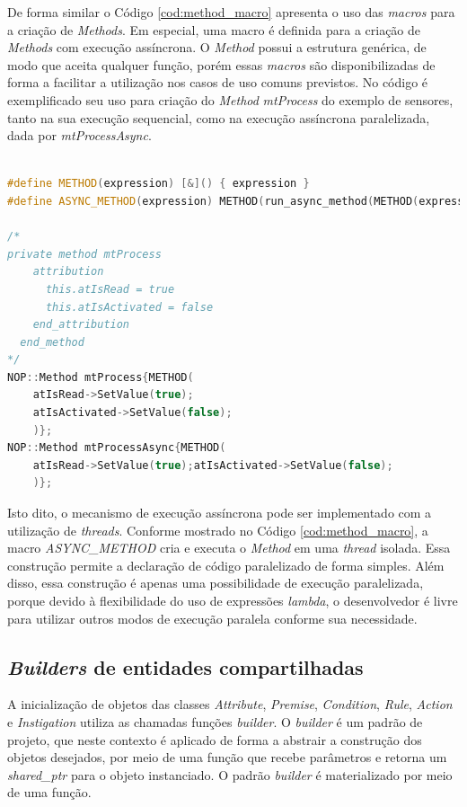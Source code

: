 De forma similar o Código \ref{cod:method_macro} apresenta o uso das
\textit{macros} para a criação de \textit{Methods}. Em especial, uma macro é
definida para a criação de \textit{Methods} com execução assíncrona. O
\textit{Method} possui a estrutura genérica, de modo que aceita qualquer função,
porém essas \textit{macros} são disponibilizadas de forma a facilitar a
utilização nos casos de uso comuns previstos. No código é exemplificado seu uso
para criação do \textit{Method} \textit{mtProcess} do exemplo de sensores, tanto
na sua execução sequencial, como na execução assíncrona paralelizada, dada por
\textit{mtProcessAsync}.

\begin{lstlisting}[language=C++, float=htb,
caption = {Uso de
\textit{Macros} para criação de \textit{Methods} no
\textit{Framework} PON C++ 4.0},
source = {Autoria própria},
label ={cod:method_macro}]

#define METHOD(expression) [&]() { expression }
#define ASYNC_METHOD(expression) METHOD(run_async_method(METHOD(expression));)
    
/*
private method mtProcess
    attribution
      this.atIsRead = true
      this.atIsActivated = false
    end_attribution
  end_method
*/
NOP::Method mtProcess{METHOD(
    atIsRead->SetValue(true);
    atIsActivated->SetValue(false);
    )};
NOP::Method mtProcessAsync{METHOD(
    atIsRead->SetValue(true);atIsActivated->SetValue(false);
    )};
\end{lstlisting}


Isto dito, o mecanismo de execução assíncrona pode ser implementado com a
utilização de \textit{threads}. Conforme mostrado no Código \ref{cod:method_macro}, a
macro \textit{ASYNC\_METHOD} cria e executa o \textit{Method} em uma
\textit{thread} isolada. Essa construção permite a declaração de código
paralelizado de forma simples. Além disso, essa construção é apenas uma
possibilidade de execução paralelizada, porque devido à flexibilidade do uso de
expressões \textit{lambda}, o desenvolvedor é livre para utilizar outros modos
de execução paralela conforme sua necessidade.

\subsection{\textit{Builders} de entidades
compartilhadas}\label{sec:builders}

A inicialização de objetos das classes \textit{Attribute}, \textit{Premise},
\textit{Condition}, \textit{Rule}, \textit{Action} e \textit{Instigation}
utiliza as chamadas funções \textit{builder}. O \textit{builder} é um padrão de
projeto, que neste contexto é aplicado de forma a abstrair a construção dos
objetos desejados, por meio de uma função que recebe parâmetros e retorna um
\textit{shared\_ptr} para o objeto instanciado. O padrão \textit{builder} é
materializado por meio de uma função.


